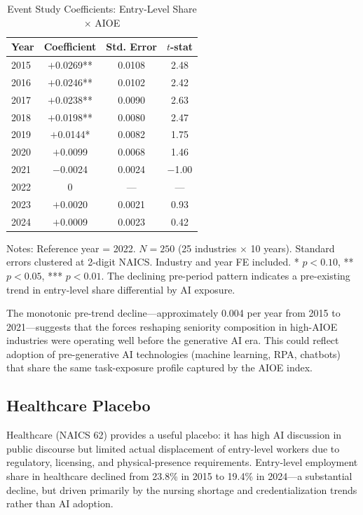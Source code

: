 \documentclass[12pt]{article}
\begin{document}
\begin{table}[H]
\centering
\caption{Event Study Coefficients: Entry-Level Share $\times$ AIOE}
\label{tab:eventstudy_coefficients}
\begin{threeparttable}
\begin{tabular}{lccc}
\toprule
Year & Coefficient & Std. Error & $t$-stat \\
\midrule
2015 & $+$0.0269** & 0.0108 & 2.48 \\
2016 & $+$0.0246** & 0.0102 & 2.42 \\
2017 & $+$0.0238** & 0.0090 & 2.63 \\
2018 & $+$0.0198** & 0.0080 & 2.47 \\
2019 & $+$0.0144* & 0.0082 & 1.75 \\
2020 & $+$0.0099 & 0.0068 & 1.46 \\
2021 & $-$0.0024 & 0.0024 & $-$1.00 \\
2022 & 0 & --- & --- \\
2023 & $+$0.0020 & 0.0021 & 0.93 \\
2024 & $+$0.0009 & 0.0023 & 0.42 \\
\bottomrule
\end{tabular}
\begin{tablenotes}[flushleft]
\small
\item Notes: Reference year = 2022. $N = 250$ (25 industries $\times$ 10 years). Standard errors clustered at 2-digit NAICS. Industry and year FE included. * $p<0.10$, ** $p<0.05$, *** $p<0.01$. The declining pre-period pattern indicates a pre-existing trend in entry-level share differential by AI exposure.
\end{tablenotes}
\end{threeparttable}
\end{table}

The monotonic pre-trend decline---approximately 0.004 per year from 2015 to 2021---suggests that the forces reshaping seniority composition in high-AIOE industries were operating well before the generative AI era. This could reflect adoption of pre-generative AI technologies (machine learning, RPA, chatbots) that share the same task-exposure profile captured by the AIOE index.

\subsection{Healthcare Placebo}

Healthcare (NAICS 62) provides a useful placebo: it has high AI discussion in public discourse but limited actual displacement of entry-level workers due to regulatory, licensing, and physical-presence requirements. Entry-level employment share in healthcare declined from 23.8\% in 2015 to 19.4\% in 2024---a substantial decline, but driven primarily by the nursing shortage and credentialization trends rather than AI adoption.
\end{document}

